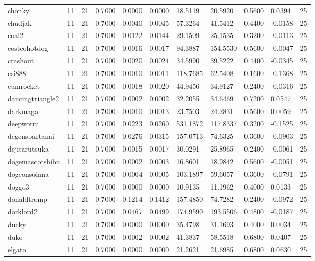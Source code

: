 \begin{table}[htbp]
\begin{tabular}{lllllllllll}
chonky & 11 & 21 & 0.7000 & 0.0000 & 0.0000 & 18.5119 & 20.5920 & 0.5600 & 0.0394 & 25 \\
chudjak & 11 & 21 & 0.7000 & 0.0040 & 0.0045 & 57.3264 & 41.5412 & 0.4400 & -0.0158 & 25 \\
coal2 & 11 & 21 & 0.7000 & 0.0122 & 0.0144 & 29.1509 & 25.1535 & 0.3200 & -0.0113 & 25 \\
costcohotdog & 11 & 21 & 0.7000 & 0.0016 & 0.0017 & 94.3887 & 154.5530 & 0.5600 & -0.0047 & 25 \\
crashout & 11 & 21 & 0.7000 & 0.0020 & 0.0024 & 34.5990 & 39.5222 & 0.4400 & -0.0345 & 25 \\
csi888 & 11 & 21 & 0.7000 & 0.0010 & 0.0011 & 118.7685 & 62.5408 & 0.1600 & -0.1368 & 25 \\
cumrocket & 11 & 21 & 0.7000 & 0.0018 & 0.0020 & 44.9456 & 34.9127 & 0.2400 & -0.0316 & 25 \\
dancingtriangle2 & 11 & 21 & 0.7000 & 0.0002 & 0.0002 & 32.2055 & 34.6469 & 0.7200 & 0.0547 & 25 \\
darkmaga & 11 & 21 & 0.7000 & 0.0010 & 0.0013 & 23.7503 & 24.2831 & 0.5600 & 0.0059 & 25 \\
deepworm & 11 & 21 & 0.7000 & 0.0223 & 0.0260 & 531.1872 & 117.8337 & 0.3200 & -0.1525 & 25 \\
degenspartanai & 11 & 21 & 0.7000 & 0.0276 & 0.0315 & 157.0713 & 74.6325 & 0.3600 & -0.0903 & 25 \\
dejitarutsuka & 11 & 21 & 0.7000 & 0.0015 & 0.0017 & 30.0291 & 25.8965 & 0.2400 & -0.0061 & 25 \\
dogemascotshibu & 11 & 21 & 0.7000 & 0.0002 & 0.0003 & 16.8601 & 18.9842 & 0.5600 & -0.0051 & 25 \\
dogeonsolana & 11 & 21 & 0.7000 & 0.0004 & 0.0005 & 103.1897 & 59.6057 & 0.3600 & -0.0791 & 25 \\
doggo3 & 11 & 21 & 0.7000 & 0.0000 & 0.0000 & 10.9135 & 11.1962 & 0.4000 & 0.0133 & 25 \\
donaldtremp & 11 & 21 & 0.7000 & 0.1214 & 0.1412 & 157.4850 & 74.7282 & 0.2400 & -0.0972 & 25 \\
dorklord2 & 11 & 21 & 0.7000 & 0.0467 & 0.0499 & 174.9590 & 193.5506 & 0.4800 & -0.0187 & 25 \\
ducky & 11 & 21 & 0.7000 & 0.0000 & 0.0000 & 35.4798 & 31.1693 & 0.4000 & 0.0034 & 25 \\
duko & 11 & 21 & 0.7000 & 0.0002 & 0.0002 & 41.3837 & 58.5518 & 0.6800 & 0.0407 & 25 \\
elgato & 11 & 21 & 0.7000 & 0.0000 & 0.0000 & 21.2621 & 21.6985 & 0.6800 & 0.0630 & 25 \\

\end{tabular}
\end{table}
